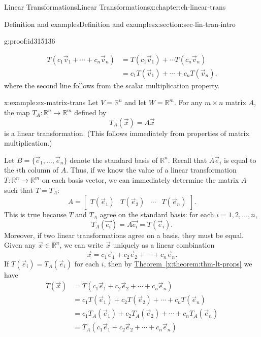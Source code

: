 \documentclass[oneside,10pt,]{book}
\numberwithin{equation}{section}
\newcommand{\bbm}{\begin{bmatrix}}
\newcommand{\ebm}{\end{bmatrix}}
\newcommand{\R}{\mathbb{R}}
\newcommand{\amp}{&}
\begin{document}
\begin{chapterptx}{Linear Transformations}{}{Linear Transformations}{}{}{x:chapter:ch-linear-trans}
\begin{sectionptx}{Definition and examples}{}{Definition and examples}{}{}{x:section:sec-lin-tran-intro}
\begin{proofptx}{}{g:proof:id315136}
\begin{enumerate}
\begin{align*}
T(c_1\vec{v}_1+\cdots + c_n\vec{v}_n) \amp = T(c_1\vec{v}_1)+ \cdots T(c_n\vec{v}_n)\\
\amp = c_1T(\vec{v}_1)+\cdots +c_nT(\vec{v}_n)\text{,}
\end{align*}
where the second line follows from the scalar multiplication property.%
\end{enumerate}
%
\end{proofptx}
\begin{example}{}{x:example:ex-matrix-trans}%
Let \(V=\R^n\) and let \(W=\R^m\). For any \(m\times n\) matrix \(A\), the map \(T_A:\R^n\to \R^m\) defined by%
\begin{equation*}
T_A(\vec{x}) = A\vec{x}
\end{equation*}
is a linear transformation. (This follows immediately from properties of matrix multiplication.)%
\par
Let \(B = \{\vec{e}_1,\ldots, \vec{e}_n\}\) denote the standard basis of \(\R^n\). Recall that \(A\vec{e}_i\) is equal to the \(i\)th column of \(A\). Thus, if we know the value of a linear transformation \(T:\R^n\to \R^m\) on each basis vector, we can immediately determine the matrix \(A\) such that \(T=T_A\):%
\begin{equation*}
A = \bbm T(\vec{e}_1) \amp T(\vec{e}_2) \amp \cdots \amp T(\vec{e}_n)\ebm\text{.}
\end{equation*}
This is true because \(T\) and \(T_A\) agree on the standard basis: for each \(i=1,2,\ldots, n\),%
\begin{equation*}
T_A(\vec{e_i}) = A\vec{e_i} = T(\vec{e}_i)\text{.}
\end{equation*}
Moreover, if two linear transformations agree on a basis, they must be equal. Given any \(\vec{x}\in \R^n\), we can write \(\vec{x}\) uniquely as a linear combination%
\begin{equation*}
\vec{x}=c_1\vec{e}_1+c_2\vec{e}_2+\cdots + c_n\vec{e}_n.
\end{equation*}
If \(T(\vec{e}_i)=T_A(\vec{e}_i)\) for each \(i\), then by \hyperref[x:theorem:thm-lt-props]{Theorem~\ref{x:theorem:thm-lt-props}} we have%
\begin{align*}
T(\vec{x}) \amp = T(c_1\vec{e}_1+c_2\vec{e}_2+\cdots + c_n\vec{e}_n) \\
\amp = c_1T(\vec{e}_1)+c_2T(\vec{e}_2)+\cdots + c_nT(\vec{e}_n)\\
\amp = c_1T_A(\vec{e}_1)+c_2T_A(\vec{e}_2)+\cdots + c_nT_A(\vec{e}_n)\\
\amp = T_A(c_1\vec{e}_1+c_2\vec{e}_2+\cdots + c_n\vec{e}_n) \\

\end{align*}
\end{example}
\end{sectionptx}
\end{chapterptx}
\end{document}
